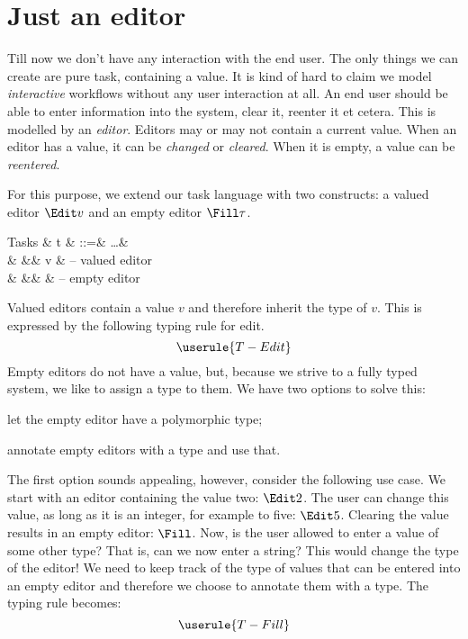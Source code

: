 
\section{Just an editor}

Till now we don't have any interaction with the end user.
The only things we can create are pure task, containing a value.
It is kind of hard to claim we model \emph{interactive} workflows without any user interaction at all.
An end user should be able to enter information into the system,
clear it, reenter it et cetera.
This is modelled by an \emph{editor}.
Editors may or may not contain a current value.
When an editor has a value, it can be \emph{changed} or \emph{cleared}.
When it is empty, a value can be \emph{reentered}.

For this purpose, we extend our task language with two constructs:
a valued editor $\Edit v$ and an empty editor $\Fill \tau$.
\begin{grammar}
  Tasks
    & t & ::=& \ldots      & \\
    &   &\mid& \Edit v     & – valued editor \\
    &   &\mid& \Fill \tau  & – empty editor \\
\end{grammar}

Valued editors contain a value $v$ and therefore inherit the type of $v$.
This is expressed by the following typing rule for edit.
\begin{equation*}
  \userule{T-Edit}
\end{equation*}
Empty editors do not have a value,
but, because we strive to a fully typed system,
we like to assign a type to them.
We have two options to solve this:
\begin{enumerate*}
  \item let the empty editor have a polymorphic type;
  \item annotate empty editors with a type and use that.
\end{enumerate*}
The first option sounds appealing, however, consider the following use case.
We start with an editor containing the value two: $\Edit 2$.
The user can change this value, as long as it is an integer,
for example to five: $\Edit 5$.
Clearing the value results in an empty editor: $\Fill$.
Now, is the user allowed to enter a value of some other type?
That is, can we now enter a string?
This would change the type of the editor!
We need to keep track of the type of values that can be entered into an empty editor
and therefore we choose to annotate them with a type.
The typing rule becomes:
\begin{equation*}
  \userule{T-Fill}
\end{equation*}


